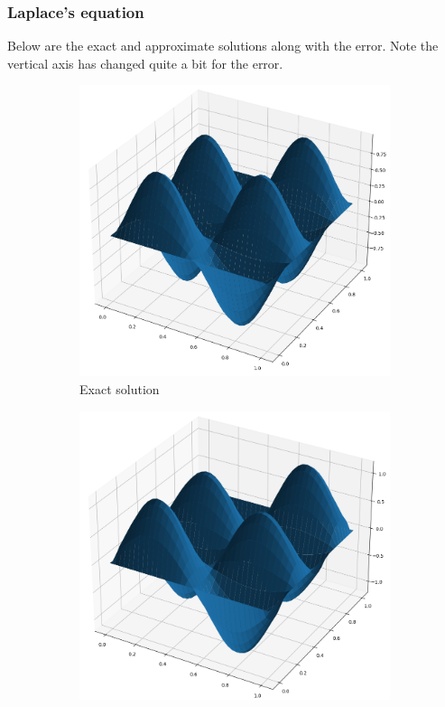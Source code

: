 \documentclass[boxes,pages]{homework}
\begin{document}
\begin{solution}
	\subsubsection*{Laplace's equation}
	Below are the exact and approximate solutions along with the error. Note the vertical axis has changed quite a bit for the error.
	\begin{figure}[h]
		\centering
		\begin{subfigure}{.5\textwidth}
			\centering
			\includegraphics[width=.9\linewidth]{problemThree/exact.png}
			\caption{Exact solution}
			\label{fig:sub1}
		\end{subfigure}%
		\begin{subfigure}{.5\textwidth}
			\centering
			\includegraphics[width=.9\linewidth]{problemThree/solution.png}

\end{subfigure}
\end{figure}
\end{solution}
\end{document}
